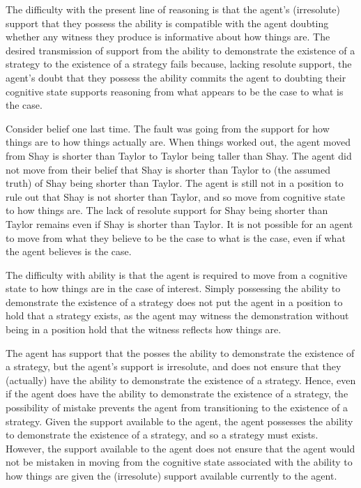 \documentclass[10pt]{article}
\begin{document}
\begin{note}
  The difficulty with the present line of reasoning is that the agent's (irresolute) support that they possess the ability is compatible with the agent doubting whether any witness they produce is informative about how things are.
  The desired transmission of support from the ability to demonstrate the existence of a strategy to the existence of a strategy fails because, lacking resolute support, the agent's doubt that they possess the ability commits the agent to doubting their cognitive state supports reasoning from what appears to be the case to what is the case.
\end{note}

\begin{note}
  Consider belief one last time.
  The fault was going from the support for how things are to how things actually are.
  When things worked out, the agent moved from Shay is shorter than Taylor to Taylor being taller than Shay.
  The agent did not move from their belief that Shay is shorter than Taylor to (the assumed truth) of Shay being shorter than Taylor.
  The agent is still not in a position to rule out that Shay is not shorter than Taylor, and so move from cognitive state to how things are.
  The lack of resolute support for Shay being shorter than Taylor remains even if Shay is shorter than Taylor.
  It is not possible for an agent to move from what they believe to be the case to what is the case, even if what the agent believes is the case.

  The difficulty with ability is that the agent is required to move from a cognitive state to how things are in the case of interest.
  Simply possessing the ability to demonstrate the existence of a strategy does not put the agent in a position to hold that a strategy exists, as the agent may witness the demonstration without being in a position hold that the witness reflects how things are.

  The agent has support that the posses the ability to demonstrate the existence of a strategy, but the agent's support is irresolute, and does not ensure that they (actually) have the ability to demonstrate the existence of a strategy.
  Hence, even if the agent does have the ability to demonstrate the existence of a strategy, the possibility of mistake prevents the agent from transitioning to the existence of a strategy.
  Given the support available to the agent, the agent possesses the ability to demonstrate the existence of a strategy, and so a strategy must exists.
  However, the support available to the agent does not ensure that the agent would not be mistaken in moving from the cognitive state associated with the ability to how things are given the (irresolute) support available currently to the agent.


\end{note}
\end{document}
